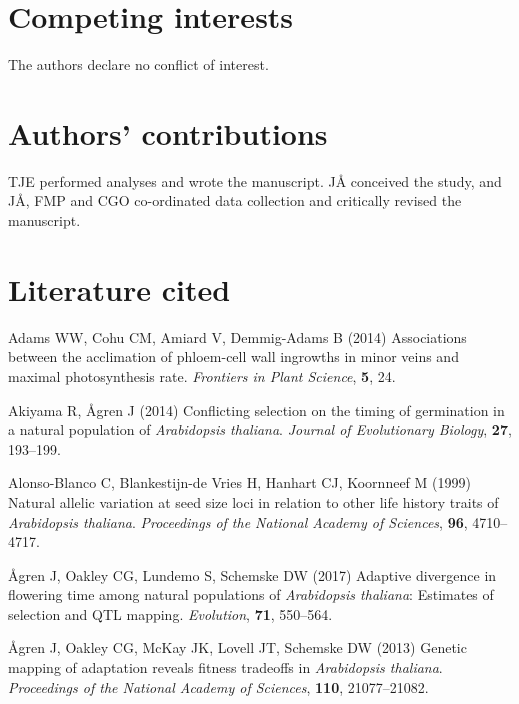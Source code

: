 \documentclass[]{article}
\begin{document}
\hypertarget{competing-interests}{%
\section{Competing interests}\label{competing-interests}}

The authors declare no conflict of interest.

\hypertarget{authors-contributions}{%
\section{Authors' contributions}\label{authors-contributions}}

TJE performed analyses and wrote the manuscript. JÅ conceived the study, and JÅ, FMP and CGO co-ordinated data collection and critically revised the manuscript.

\hypertarget{literature-cited}{%
\section{Literature cited}\label{literature-cited}}

\hypertarget{refs}{}
\leavevmode\hypertarget{ref-adams2014associations}{}%
Adams WW, Cohu CM, Amiard V, Demmig-Adams B (2014) Associations between the acclimation of phloem-cell wall ingrowths in minor veins and maximal photosynthesis rate. \emph{Frontiers in Plant Science}, \textbf{5}, 24.

\leavevmode\hypertarget{ref-akiyama2014conflicting}{}%
Akiyama R, Ågren J (2014) Conflicting selection on the timing of germination in a natural population of \emph{Arabidopsis thaliana}. \emph{Journal of Evolutionary Biology}, \textbf{27}, 193--199.

\leavevmode\hypertarget{ref-alonso1999natural}{}%
Alonso-Blanco C, Blankestijn-de Vries H, Hanhart CJ, Koornneef M (1999) Natural allelic variation at seed size loci in relation to other life history traits of \emph{Arabidopsis thaliana}. \emph{Proceedings of the National Academy of Sciences}, \textbf{96}, 4710--4717.

\leavevmode\hypertarget{ref-agren_flowering_time}{}%
Ågren J, Oakley CG, Lundemo S, Schemske DW (2017) Adaptive divergence in flowering time among natural populations of \emph{Arabidopsis thaliana}: Estimates of selection and QTL mapping. \emph{Evolution}, \textbf{71}, 550--564.

\leavevmode\hypertarget{ref-agren_genetic_2013}{}%
Ågren J, Oakley CG, McKay JK, Lovell JT, Schemske DW (2013) Genetic mapping of adaptation reveals fitness tradeoffs in \emph{Arabidopsis thaliana}. \emph{Proceedings of the National Academy of Sciences}, \textbf{110}, 21077--21082.
\end{document}
